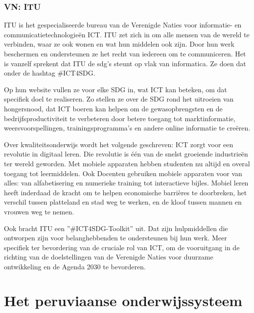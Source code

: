 \subsubsection{VN: ITU}
ITU is het gespecialiseerde bureau van de Verenigde Naties voor informatie- en communicatietechnologieën ICT. ITU zet zich in om alle mensen van de wereld te verbinden, waar ze ook wonen en wat hun middelen ook zijn. Door hun werk beschermen en ondersteunen ze het recht van iedereen om te communiceren.
Het is vanzelf sprekent dat ITU de sdg's steunt op vlak van informatica. Ze doen dat onder de hashtag \#ICT4SDG. \autocite{ITU2015}

Op hun website vullen ze voor elke SDG in, wat ICT kan beteken, om dat  specifiek doel te realiseren. Zo stellen ze over de SDG rond het uitroeien van hongersnood, dat ICT boeren kan helpen om de gewasopbrengsten en de bedrijfsproductiviteit te verbeteren door betere toegang tot marktinformatie, weersvoorspellingen, trainingsprogramma's en andere online informatie te creëren. \autocite{ITU2015}

Over kwaliteitsonderwijs wordt het volgende geschreven: ICT zorgt voor een revolutie in digitaal leren. Die revolutie is één van de snelst groeiende industrieën ter wereld geworden. Met mobiele apparaten hebben studenten nu altijd en overal toegang tot leermiddelen. Ook Docenten gebruiken mobiele apparaten voor van alles: van alfabetisering en numerieke training tot interactieve bijles. Mobiel leren heeft inderdaad de kracht om te helpen economische barrières te doorbreken, het verschil tussen platteland en stad weg te werken, en de kloof tussen mannen en vrouwen weg te nemen. \autocite{ITU2015}

Ook bracht ITU een ''\#ICT4SDG-Toolkit'' uit. Dat zijn hulpmiddellen die ontworpen zijn voor belanghebbenden te ondersteunen bij hun werk. Meer specifiek ter bevordering van de cruciale rol van ICT, om de vooruitgang in de richting van de doelstellingen van de Verenigde Naties voor duurzame ontwikkeling en de Agenda 2030 te bevorderen. \autocite{ITU2015}
 
\section{Het peruviaanse onderwijssysteem}
